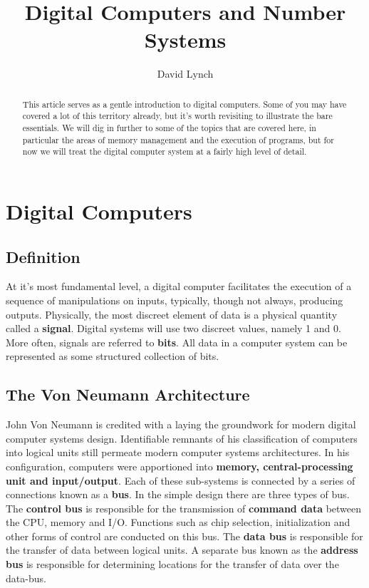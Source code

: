 \documentclass[10pt,a4paper]{article}
\title{Digital Computers and Number Systems}
\author{David Lynch}
\begin{document}
\maketitle
\begin{abstract}
This article serves as a gentle introduction to digital computers. Some of you may have covered a lot of this territory already, but it's worth revisiting to illustrate the bare essentials. We will dig in further to some of the topics that are covered here, in particular the areas of memory management and the execution of programs, but for now we will treat the digital computer system at a fairly high level of detail. 
\end{abstract}
\section{Digital Computers}
\subsection{Definition}
At it's most fundamental level, a digital computer facilitates the execution of a sequence of manipulations on inputs, typically, though not always, producing outputs. Physically, the most discreet element of data is a physical quantity called a {\bf signal}. Digital systems will use two discreet values, namely 1 and 0. More often, signals are referred to {\bf bits}. All data in a computer system can be represented as some structured collection of bits. 
\subsection{The Von Neumann Architecture}
John Von Neumann is credited with a laying the groundwork for modern digital computer systems design. Identifiable remnants of his classification of computers into logical units still permeate modern computer systems architectures. In his configuration, computers were apportioned into {\bf memory, central-processing unit and input/output}. Each of these sub-systems is connected by a series of connections known as a {\bf bus}. In the simple design there are three types of bus. The {\bf control bus} is responsible for the transmission of {\bf command data} between the CPU, memory and I/O. Functions such as chip selection, initialization and other forms of control are conducted on this bus. The {\bf data bus} is responsible for the transfer of data between logical units. A separate bus known as the {\bf address bus} is responsible for determining locations for the transfer of data over the data-bus. 
\end{document}
